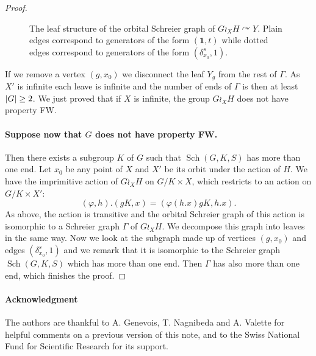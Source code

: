 \documentclass[a4paper]{article}
\theoremstyle{definition}
\theoremstyle{remark}
\DeclareMathOperator\Sch{Sch}
\DeclarePairedDelimiter\abs{\lvert}{\rvert}
\begin{document}
\begin{proof}
\begin{figure}[htbp]
\caption{The leaf structure of the orbital Schreier graph of $G\wr_XH \curvearrowright Y$. Plain edges correspond to generators of the form $(\mathbf 1,t)$ while dotted edges correspond to generators of the form $(\delta_{x_0}^s,1)$.}
\label{Figure:Leaves}
\end{figure}

%
%

If we remove a vertex $(g,x_0)$ we disconnect the leaf $Y_g$ from the rest of $\Gamma$. As $X'$ is infinite each leave is infinite and the number of ends of $\Gamma$ is then at least $\abs{G}\geq 2$. We just proved that if $X$ is infinite, the group $G\wr_XH$ does not have property FW.
%
%
%
\paragraph{Suppose now that $G$ does not have property FW.} Then there exists a subgroup $K$ of $G$ such that $\Sch(G,K,S)$ has more than one end.
Let $x_0$ be any point of $X$ and $X'$ be its orbit under the action of $H$.
We have the imprimitive action of $G\wr_XH$ on $G/K\times X$, which restricts to an action on $G/K\times X'$:
\[
	(\varphi,h).(gK,x) = (\varphi(h.x) gK, h.x).
\]
As above, the action is transitive and the orbital Schreier graph of this action is isomorphic to a Schreier graph $\Gamma$ of $G\wr_XH$. We decompose this graph into leaves in the same way. Now we look at the subgraph made up of vertices $(g,x_0)$ and edges $(\delta_{x_0}^s,1)$ and we remark that it is isomorphic to the Schreier graph $\Sch(G,K,S)$ which has more than one end. Then $\Gamma$ has also more than one end, which finishes the proof.
\end{proof}%
%
\paragraph{Acknowledgment}
The authors are thankful to A. Genevois, T. Nagnibeda and A. Valette for helpful comments on a previous version of this note, and to the Swiss National Fund for Scientific Research for its support.
\end{document}
